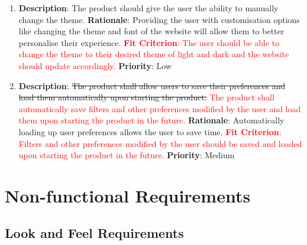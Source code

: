 \documentclass[12pt, titlepage]{article}
\begin{document}
\begin{enumerate}[label = FR-\arabic*, left=\parindent, series=fr]
    \item \textbf{Description}: The product should give the user the ability to manually change the theme.
    \newline \textbf{Rationale}: Providing the user with customisation options like changing the theme and font of the website will allow them to better personalise their experience. 
    \newline \textcolor{red} {\textbf{Fit Criterion}: The user should be able to change the theme to their desired theme of light and dark and the website should update accordingly.}
    \newline \textbf{Priority}: Low
    
    \item \textbf{Description}: \sout{The product shall allow users to save their preferences and load them automatically upon starting the product.} \textcolor{red}{The product shall automatically save filters and other preferences modified by the user and load them upon starting the product in the future.}
    \newline \textbf{Rationale}: Automatically loading up user preferences allows the user to save time.
    \newline \textcolor{red} {\textbf{Fit Criterion}: Filters and other preferences modified by the user should be saved and loaded upon starting the product in the future.}
    \newline \textbf{Priority}: Medium
    
\end{enumerate}

\section{Non-functional Requirements}

\subsection{Look and Feel Requirements}
\end{document}

